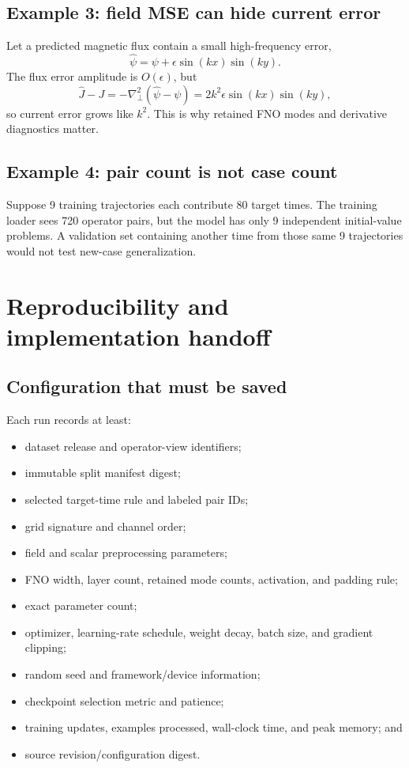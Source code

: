 \documentclass[11pt]{article}
\newcommand{\Lap}{\nabla_\perp^2}
\begin{document}
\subsection{Example 3: field MSE can hide current error}
Let a predicted magnetic flux contain a small high-frequency error,
\[
\widehat\psi=\psi+\epsilon\sin(kx)\sin(ky).
\]
The flux error amplitude is $O(\epsilon)$, but
\[
\widehat J-J
=-\Lap(\widehat\psi-\psi)
=2k^2\epsilon\sin(kx)\sin(ky),
\]
so current error grows like $k^2$. This is why retained FNO modes and derivative diagnostics matter.

\subsection{Example 4: pair count is not case count}
Suppose 9 training trajectories each contribute 80 target times. The training loader sees 720 operator pairs, but the model has only 9 independent initial-value problems. A validation set containing another time from those same 9 trajectories would not test new-case generalization.

\section{Reproducibility and implementation handoff}
\label{sec:repro}

\subsection{Configuration that must be saved}
Each run records at least:
\begin{itemize}
  \item dataset release and operator-view identifiers;
  \item immutable split manifest digest;
  \item selected target-time rule and labeled pair IDs;
  \item grid signature and channel order;
  \item field and scalar preprocessing parameters;
  \item FNO width, layer count, retained mode counts, activation, and padding rule;
  \item exact parameter count;
  \item optimizer, learning-rate schedule, weight decay, batch size, and gradient clipping;
  \item random seed and framework/device information;
  \item checkpoint selection metric and patience;
  \item training updates, examples processed, wall-clock time, and peak memory; and
  \item source revision/configuration digest.
\end{itemize}
\end{document}
